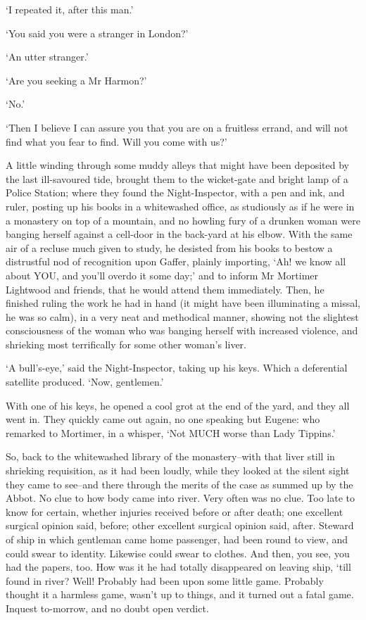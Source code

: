 ‘I repeated it, after this man.’

‘You said you were a stranger in London?’

‘An utter stranger.’

‘Are you seeking a Mr Harmon?’

‘No.’

‘Then I believe I can assure you that you are on a fruitless errand, and
will not find what you fear to find. Will you come with us?’

A little winding through some muddy alleys that might have been
deposited by the last ill-savoured tide, brought them to the
wicket-gate and bright lamp of a Police Station; where they found the
Night-Inspector, with a pen and ink, and ruler, posting up his books in
a whitewashed office, as studiously as if he were in a monastery on
top of a mountain, and no howling fury of a drunken woman were banging
herself against a cell-door in the back-yard at his elbow. With the
same air of a recluse much given to study, he desisted from his books to
bestow a distrustful nod of recognition upon Gaffer, plainly importing,
‘Ah! we know all about YOU, and you’ll overdo it some day;’ and to
inform Mr Mortimer Lightwood and friends, that he would attend them
immediately. Then, he finished ruling the work he had in hand (it might
have been illuminating a missal, he was so calm), in a very neat and
methodical manner, showing not the slightest consciousness of the woman
who was banging herself with increased violence, and shrieking most
terrifically for some other woman’s liver.

‘A bull’s-eye,’ said the Night-Inspector, taking up his keys. Which a
deferential satellite produced. ‘Now, gentlemen.’

With one of his keys, he opened a cool grot at the end of the yard,
and they all went in. They quickly came out again, no one speaking but
Eugene: who remarked to Mortimer, in a whisper, ‘Not MUCH worse than
Lady Tippins.’

So, back to the whitewashed library of the monastery--with that liver
still in shrieking requisition, as it had been loudly, while they looked
at the silent sight they came to see--and there through the merits of
the case as summed up by the Abbot. No clue to how body came into river.
Very often was no clue. Too late to know for certain, whether injuries
received before or after death; one excellent surgical opinion said,
before; other excellent surgical opinion said, after. Steward of ship in
which gentleman came home passenger, had been round to view, and could
swear to identity. Likewise could swear to clothes. And then, you
see, you had the papers, too. How was it he had totally disappeared on
leaving ship, ‘till found in river? Well! Probably had been upon some
little game. Probably thought it a harmless game, wasn’t up to things,
and it turned out a fatal game. Inquest to-morrow, and no doubt open
verdict.

